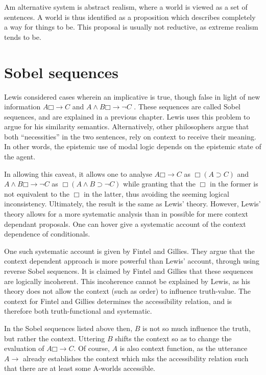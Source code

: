 \documentclass[12pt]{report}
\newcommand{\would}{{\mathbin{\Box}{\rightarrow}}}
\begin{document}
Am alternative system is abstract realism, where a world is viewed as a set of
sentences. A world is thus identified as a proposition which describes
completely a way for things to be. This proposal is usually not reductive, as
extreme realism tends to be.

\section{Sobel sequences}

Lewis considered cases wherein an implicative is true, though false in light of
new information $A \would C$ and $A \land B \would \lnot C$ . These sequences
are called Sobel sequences, and are explained in a previous chapter. Lewis uses
this problem to argue for his similarity semantics. Alternatively, other
philosophers argue that both ``necessities'' in the two sentences, rely on
context to receive their meaning. In other words, the epistemic use of modal
logic depends on the epistemic state of the agent.

In allowing this caveat, it allows one to analyse $A \would C$ as $\Box (A
\supset C)$ and  $A \land B \would \lnot C$ as $\Box (A \land B \supset \lnot
C)$ while granting that the $\Box$ in the former is not equivalent to the $\Box$
in the latter, thus avoiding the seeming logical inconsistency. Ultimately, the
result is the same as Lewis' theory. However, Lewis' theory allows for a more
systematic analysis than in possible for mere context dependant proposals. One
can hover give a systematic account of the context dependence of conditionals.

One such systematic account is given by Fintel and Gillies. They argue that the
context dependent approach is more powerful than Lewis' account, through using
reverse Sobel sequences. It is claimed by Fintel and Gillies that these
sequences are logically incoherent. This incoherence cannot be explained by
Lewis, as his theory does not allow the context (such as order) to influence
truth-value. The context for Fintel and Gillies determines the accessibility
relation, and is therefore both truth-functional and systematic.

In the Sobel sequences listed above then, $B$ is not so much influence the
truth, but rather the context. Uttering $B$ shifts the context so as to change
the evaluation of $A \would C$. Of course, $A$ is also context function, as the
utterance $A \rightarrow$ already establishes the context which mks the
accessibility relation such that there are at least some A-worlds accessible.
\end{document}
